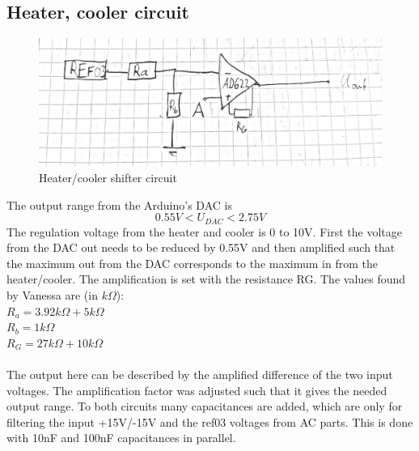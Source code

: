 \documentclass[12pt]{scrartcl}
\begin{document}
    \subsection{Heater, cooler circuit}
      \begin{figure}[h]
        \includegraphics[width = \textwidth]{circ2.png}
        \caption{Heater/cooler shifter circuit}
        \label{fig3}
      \end{figure}
      The output range from the Arduino's DAC is $$0.55V < U_{DAC} < 2.75V$$
      The regulation voltage from the heater and cooler is 0 to 10V. First the
      voltage from the DAC out needs to be reduced by 0.55V and then amplified
      such that the maximum out from the DAC corresponds to the maximum in from
      the heater/cooler. The amplification is set with the resistance RG.
      The values found by Vanessa are (in $k\Omega$): \\
      $R_a = 3.92k\Omega + 5k\Omega$ \\ $R_b = 1k\Omega$ \\
      $R_G = 27k\Omega + 10k\Omega$ \\ \\
      The output here can be described by the amplified difference of the two
      input voltages. The amplification factor was adjusted such that it gives
      the needed output range.
      To both circuits many capacitances are added, which are only for filtering
      the input +15V/-15V and the ref03 voltages from AC parts. This is done with
      10nF and 100nF capacitances in parallel.
\end{document}
